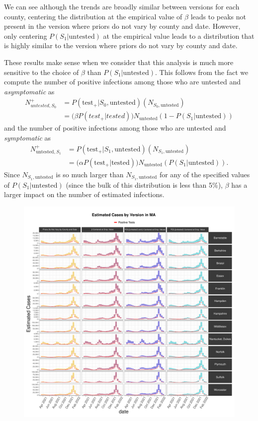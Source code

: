 \documentclass[12pt,twoside]{smiththesis}
\begin{document}
We can see although the trends are broadly similar between versions for each county, centering the distribution at the empirical value of \(\beta\) leads to peaks not present in the version where priors do not vary by county and date. However, only centering \(P(S_1|\text{untested})\) at the empirical value leads to a distribution that is highly similar to the version where priors do not vary by county and date.

These results make sense when we consider that this analysis is much more sensitive to the choice of \(\beta\) than \(P(S_1|\text{untested})\). This follows from the fact we compute the number of positive infections among those who are untested and \emph{asymptomatic} as
\begin{align*}
N^+_{untested,S_0} &= P(\text{test}_+| S_0,\text{untested}) (N_{S_0,\text{untested}})\\
&= \Big( \beta P(test_+ |tested) \Big) N_{\text{untested}} (1-P(S_1|\text{untested}))
\end{align*}
and the number of positive infections among those who are untested and \emph{symptomatic} as\\
\begin{align*} N^+_{\text{untested},S_1}& = P(\text{test}_+| S_1,\text{untested}) (N_{S_1,\text{untested}})\\
&= \Big( \alpha P(\text{test}_+ |\text{tested}) \Big) N_{\text{untested}} (P(S_1|\text{untested})).
\end{align*}
Since \(N_{S_1, \text{untested}}\) is so much larger than \(N_{S_1, \text{untested}}\) for any of the specified values of \(P(S_1|\text{untested})\) (since the bulk of this distribution is less than 5\%), \(\beta\) has a larger impact on the number of estimated infections.
\begin{figure}
\includegraphics[width=0.95\linewidth]{figure/ma_pb_compared_to_observed} \caption{\label{fig:pb_counts_ma}}\label{fig:unnamed-chunk-69}
\end{figure}
\end{document}
